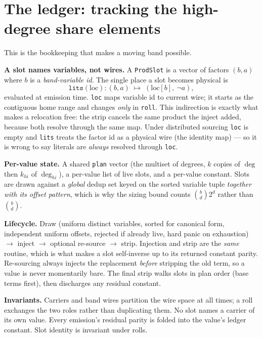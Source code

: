 \documentclass[11pt]{article}
\newcommand{\code}[1]{\texttt{#1}}
\begin{document}
\section{The ledger: tracking the high-degree share elements}
\label{sec:ledger}

This is the bookkeeping that makes a moving band possible.

\textbf{A slot names variables, not wires.} A \code{ProdSlot} is a vector of
factors $(b, a)$ where $b$ is a \emph{band-variable id}. The single place a slot
becomes physical is
\[
\code{lits}(\mathrm{loc}) : (b,a) \;\mapsto\; (\mathrm{loc}[b],\ \lnot a),
\]
evaluated at emission time. \code{loc} maps variable id to current wire; it
starts as the contiguous home range and changes \emph{only} in \code{roll}. This
indirection is exactly what makes a relocation free: the strip cancels the same
product the inject added, because both resolve through the same map. Under
distributed sourcing \code{loc} is empty and \code{lits} treats the factor id as
a physical wire (the identity map) --- so it is wrong to say literals are
\emph{always} resolved through \code{loc}.

\textbf{Per-value state.} A shared \code{plan} vector (the multiset of degrees,
$k$ copies of $\deg$ then $k_{hi}$ of $\deg_{hi}$), a per-value list of live
slots, and a per-value constant. Slots are drawn against a \emph{global} dedup
set keyed on the sorted variable tuple \emph{together with its offset pattern},
which is why the sizing bound counts $\binom{b}{d}2^{d}$ rather than
$\binom{b}{d}$.

\textbf{Lifecycle.} Draw (uniform distinct variables, sorted for canonical
form, independent uniform offsets, rejected if already live, hard panic on
exhaustion) $\to$ inject $\to$ optional re-source $\to$ strip. Injection and
strip are the \emph{same} routine, which is what makes a slot self-inverse up to
its returned constant parity. Re-sourcing always injects the replacement
\emph{before} stripping the old term, so a value is never momentarily bare. The
final strip walks slots in plan order (base terms first), then discharges any
residual constant.

\textbf{Invariants.} Carriers and band wires partition the wire space at all
times; a roll exchanges the two roles rather than duplicating them. No slot
names a carrier of its own value. Every emission's residual parity is folded
into the value's ledger constant. Slot identity is invariant under rolls.
\end{document}
